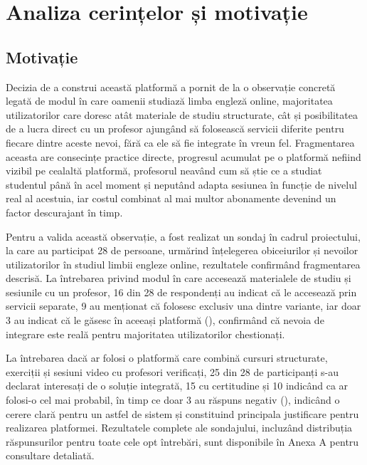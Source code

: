 \chapter{Analiza cerințelor și motivație}

\section{Motivație}
Decizia de a construi această platformă a pornit de la o observație concretă legată de modul în care oamenii studiază limba engleză online, majoritatea utilizatorilor care doresc atât materiale de studiu structurate, cât și posibilitatea de a lucra direct cu un profesor ajungând să folosească servicii diferite pentru fiecare dintre aceste nevoi, fără ca ele să fie integrate în vreun fel. Fragmentarea aceasta are consecințe practice directe, progresul acumulat pe o platformă nefiind vizibil pe cealaltă platformă, profesorul neavând cum să știe ce a studiat studentul până în acel moment și neputând adapta sesiunea în funcție de nivelul real al acestuia, iar costul combinat al mai multor abonamente devenind un factor descurajant în timp.

Pentru a valida această observație, a fost realizat un sondaj în cadrul proiectului, la care au participat 28 de persoane, urmărind înțelegerea obiceiurilor și nevoilor utilizatorilor în studiul limbii engleze online, rezultatele confirmând fragmentarea descrisă. La întrebarea privind modul în care accesează materialele de studiu și sesiunile cu un profesor, 16 din 28 de respondenți au indicat că le accesează prin servicii separate, 9 au menționat că folosesc exclusiv una dintre variante, iar doar 3 au indicat că le găsesc în aceeași platformă (), confirmând că nevoia de integrare este reală pentru majoritatea utilizatorilor chestionați.

La întrebarea dacă ar folosi o platformă care combină cursuri structurate, exerciții și sesiuni video cu profesori verificați, 25 din 28 de participanți s-au declarat interesați de o soluție integrată, 15 cu certitudine și 10 indicând ca ar folosi-o cel mai probabil, în timp ce doar 3 au răspuns negativ (), indicând o cerere clară pentru un astfel de sistem și constituind principala justificare pentru realizarea platformei. Rezultatele complete ale sondajului, incluzând distribuția răspunsurilor pentru toate cele opt întrebări, sunt disponibile în Anexa A pentru consultare detaliată.

